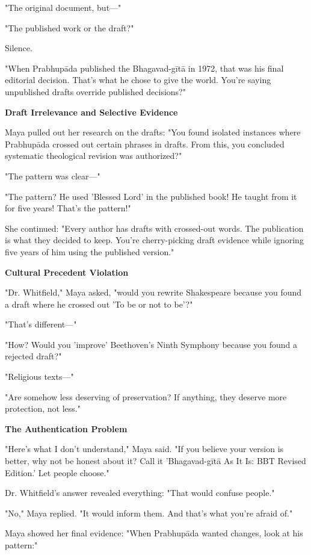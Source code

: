\documentclass[12pt,twoside]{book}
\begin{document}
"The original document, but—"

"The published work or the draft?"

Silence.

"When Prabhupāda published the Bhagavad-gītā in 1972, that was his final editorial decision. That's what he chose to give the world. You're saying unpublished drafts override published decisions?"

\textbf{\textbf{\textbf{Draft Irrelevance and Selective Evidence}}}

Maya pulled out her research on the drafts: "You found isolated instances where Prabhupāda crossed out certain phrases in drafts. From this, you concluded systematic theological revision was authorized?"

"The pattern was clear—"

"The pattern? He used 'Blessed Lord' in the published book! He taught from it for five years! That's the pattern!"

She continued: "Every author has drafts with crossed-out words. The publication is what they decided to keep. You're cherry-picking draft evidence while ignoring five years of him using the published version."

\textbf{\textbf{\textbf{Cultural Precedent Violation}}}

"Dr. Whitfield," Maya asked, "would you rewrite Shakespeare because you found a draft where he crossed out 'To be or not to be'?"

"That's different—"

"How? Would you 'improve' Beethoven's Ninth Symphony because you found a rejected draft?"

"Religious texts—"

"Are somehow less deserving of preservation? If anything, they deserve more protection, not less."

\textbf{\textbf{\textbf{The Authentication Problem}}}

"Here's what I don't understand," Maya said. "If you believe your version is better, why not be honest about it? Call it 'Bhagavad-gītā As It Is: BBT Revised Edition.' Let people choose."

Dr. Whitfield's answer revealed everything: "That would confuse people."

"No," Maya replied. "It would inform them. And that's what you're afraid of."

Maya showed her final evidence: "When Prabhupāda wanted changes, look at his pattern:"
\end{document}
